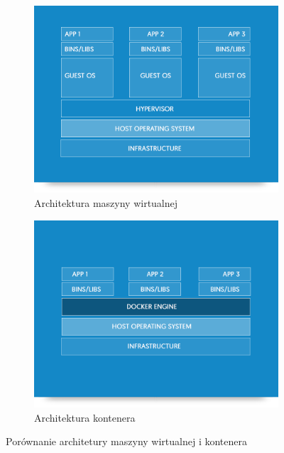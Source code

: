 \begin{figure}[h]
\centering
\begin{subfigure}{.5\textwidth}
  \centering
  \includegraphics[width=.8\linewidth]{img/vm.png}
  \caption{Architektura maszyny wirtualnej}
  \label{fig:vm}
\end{subfigure}%
\begin{subfigure}{.5\textwidth}
  \centering
  \includegraphics[width=.8\linewidth]{img/docker.png}
  \caption{Architektura kontenera}
  \label{fig:docker}
\end{subfigure}
\caption{Porównanie architetury maszyny wirtualnej i kontenera}
\label{fig:vm2docker}
\end{figure}

